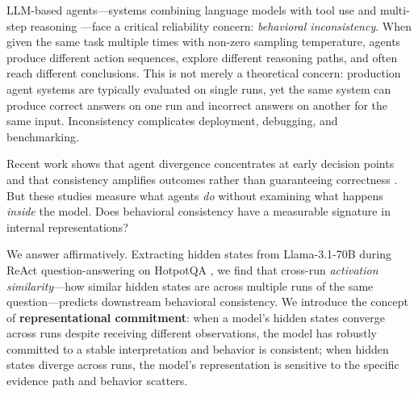 \documentclass{article}
\begin{document}
LLM-based agents---systems combining language models with tool use and multi-step reasoning \citep{react, cot}---face a critical reliability concern: \emph{behavioral inconsistency}. When given the same task multiple times with non-zero sampling temperature, agents produce different action sequences, explore different reasoning paths, and often reach different conclusions. This is not merely a theoretical concern: production agent systems are typically evaluated on single runs, yet the same system can produce correct answers on one run and incorrect answers on another for the same input. Inconsistency complicates deployment, debugging, and benchmarking.

Recent work shows that agent divergence concentrates at early decision points \citep{anonymous2026a} and that consistency amplifies outcomes rather than guaranteeing correctness \citep{anonymous2026b}. But these studies measure what agents \emph{do} without examining what happens \emph{inside} the model. Does behavioral consistency have a measurable signature in internal representations?

We answer affirmatively. Extracting hidden states from Llama-3.1-70B \citep{llama3} during ReAct \citep{react} question-answering on HotpotQA \citep{hotpotqa}, we find that cross-run \emph{activation similarity}---how similar hidden states are across multiple runs of the same question---predicts downstream behavioral consistency. We introduce the concept of \textbf{representational commitment}: when a model's hidden states converge across runs despite receiving different observations, the model has robustly committed to a stable interpretation and behavior is consistent; when hidden states diverge across runs, the model's representation is sensitive to the specific evidence path and behavior scatters.
\end{document}
